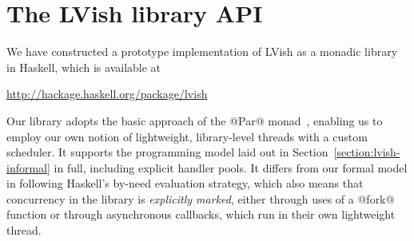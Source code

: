 \section{The LVish library API}\label{section:lvish-api}



We have constructed a prototype implementation of LVish as a monadic library in
Haskell, which is available at 
\begin{center}
\url{http://hackage.haskell.org/package/lvish}
\end{center}
%
Our library adopts the basic approach
of the @Par@ monad~\cite{monad-par}, enabling us to employ our own notion of
lightweight, library-level threads with a custom scheduler.  It supports the
programming model laid out in Section~\ref{section:lvish-informal} in full,
including explicit handler pools.  It differs from our formal model in following
Haskell's by-need evaluation strategy, which also means that concurrency in the
library is \emph{explicitly marked}, either through uses of a @fork@ function or
through asynchronous callbacks, which run in their own lightweight thread.

